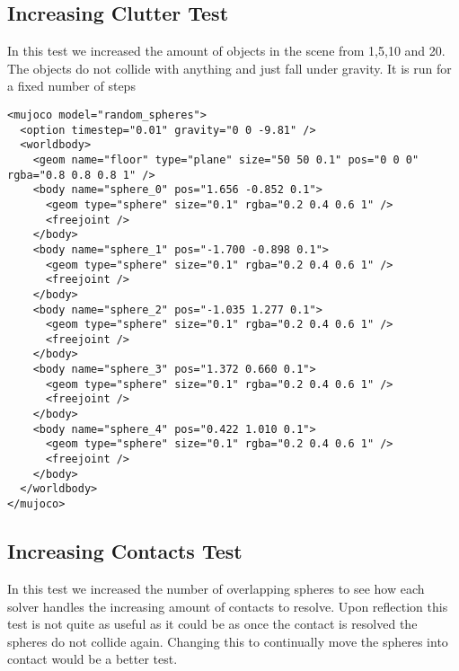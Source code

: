 \documentclass[11pt,a4paper]{article}
\begin{document}
\subsection{Increasing Clutter Test}
In this test we increased the amount of objects in the scene from 1,5,10 and 20. The objects do not collide with anything and just fall under gravity. It is run for a fixed number of steps

\begin{lstlisting}[style=xmlstyle, caption={Pendulum XML model}, label=lst:pendulum_xml]
<mujoco model="random_spheres">
  <option timestep="0.01" gravity="0 0 -9.81" />
  <worldbody>
    <geom name="floor" type="plane" size="50 50 0.1" pos="0 0 0" rgba="0.8 0.8 0.8 1" />
    <body name="sphere_0" pos="1.656 -0.852 0.1">
      <geom type="sphere" size="0.1" rgba="0.2 0.4 0.6 1" />
      <freejoint />
    </body>
    <body name="sphere_1" pos="-1.700 -0.898 0.1">
      <geom type="sphere" size="0.1" rgba="0.2 0.4 0.6 1" />
      <freejoint />
    </body>
    <body name="sphere_2" pos="-1.035 1.277 0.1">
      <geom type="sphere" size="0.1" rgba="0.2 0.4 0.6 1" />
      <freejoint />
    </body>
    <body name="sphere_3" pos="1.372 0.660 0.1">
      <geom type="sphere" size="0.1" rgba="0.2 0.4 0.6 1" />
      <freejoint />
    </body>
    <body name="sphere_4" pos="0.422 1.010 0.1">
      <geom type="sphere" size="0.1" rgba="0.2 0.4 0.6 1" />
      <freejoint />
    </body>
  </worldbody>
</mujoco>
\end{lstlisting}

\subsection{Increasing Contacts Test}
In this test we increased the number of overlapping spheres to see how each solver handles the increasing amount of contacts to resolve. Upon reflection this test is not quite as useful as it could be as once the contact is resolved the spheres do not collide again. Changing this to continually move the spheres into contact would be a better test.
\end{document}
